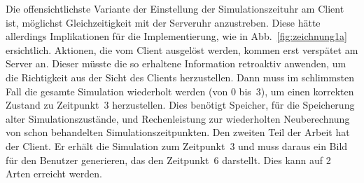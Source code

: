 Die offensichtlichste Variante der Einstellung der Simulationszeituhr am Client ist, möglichst Gleichzeitigkeit mit der Serveruhr anzustreben. Diese hätte allerdings Implikationen für die Implementierung, wie in Abb.~\ref{fig:zeichnung1a} ersichtlich. 
Aktionen, die vom Client ausgelöst werden, kommen erst verspätet am Server an.
Dieser müsste die so erhaltene Information retroaktiv anwenden, um die Richtigkeit aus der Sicht des Clients herzustellen.
Dann muss im schlimmsten Fall die gesamte Simulation wiederholt werden (von 0 bis~3), um einen korrekten Zustand zu Zeitpunkt~3 herzustellen. Dies benötigt Speicher, für die Speicherung alter Simulationszustände, und Rechenleistung zur wiederholten Neuberechnung von schon behandelten Simulationszeitpunkten. Den zweiten Teil der Arbeit hat der Client. Er erhält die Simulation zum Zeitpunkt~3 und muss daraus ein Bild für den Benutzer generieren, das den Zeitpunkt~6 darstellt. Dies kann auf 2 Arten erreicht werden.
